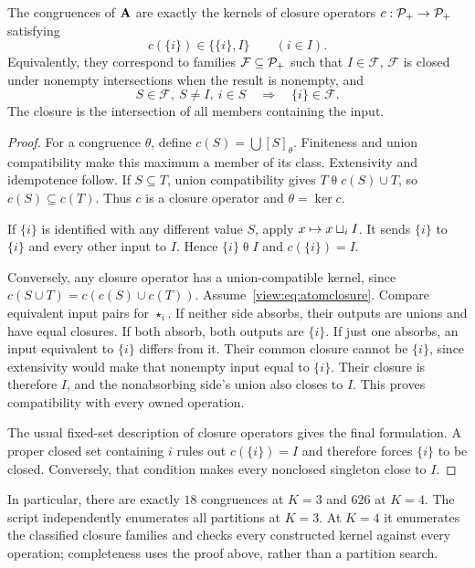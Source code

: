 \begin{theorem}\label{view:thm:congruences}
The congruences of $\mathbf A$ are exactly the kernels of closure operators
$c:\mathcal P_+\to\mathcal P_+$ satisfying
\begin{equation}\label{view:eq:atomclosure}
 c(\{i\})\in\{\{i\},I\}\qquad(i\in I).
\end{equation}
Equivalently, they correspond to families $\mathcal F\subseteq\mathcal P_+$
such that $I\in\mathcal F$, $\mathcal F$ is closed under nonempty
intersections when the result is nonempty, and
\[
 S\in\mathcal F,\ S\ne I,\ i\in S\quad\Longrightarrow\quad
 \{i\}\in\mathcal F.
\]
The closure is the intersection of all members containing the input.
\end{theorem}
\begin{proof}
For a congruence $\theta$, define
$c(S)=\bigcup[S]_\theta$. Finiteness and union compatibility make this
maximum a member of its class. Extensivity and idempotence follow.
If $S\subseteq T$, union compatibility gives
$T\mathrel\theta c(S)\cup T$, so $c(S)\subseteq c(T)$. Thus $c$ is a
closure operator and $\theta=\ker c$.

If $\{i\}$ is identified with any different value $S$, apply
$x\mapsto x\mathbin{\sqcup_{i}} I$. It sends $\{i\}$ to $\{i\}$ and every other input
to $I$. Hence $\{i\}\mathrel\theta I$ and $c(\{i\})=I$.

Conversely, any closure operator has a union-compatible kernel, since
$c(S\cup T)=c(c(S)\cup c(T))$. Assume~\eqref{view:eq:atomclosure}. Compare
equivalent input pairs for $\star_i$. If neither side absorbs, their
outputs are unions and have equal closures. If both absorb, both outputs
are $\{i\}$. If just one absorbs, an input equivalent to $\{i\}$ differs
from it. Their common closure cannot be $\{i\}$, since extensivity would
make that nonempty input equal to $\{i\}$. Their closure is therefore
$I$, and the nonabsorbing side's union also closes to $I$. This proves compatibility
with every owned operation.

The usual fixed-set description of closure operators gives the final
formulation. A proper closed set containing $i$ rules out
$c(\{i\})=I$ and therefore forces $\{i\}$ to be closed. Conversely, that
condition makes every nonclosed singleton close to $I$.
\end{proof}

In particular, there are exactly $18$ congruences at $K=3$ and $626$ at
$K=4$. The script independently enumerates all partitions at $K=3$.
At $K=4$ it enumerates the classified closure families and checks every
constructed kernel against every operation; completeness uses the proof
above, rather than a partition search.

